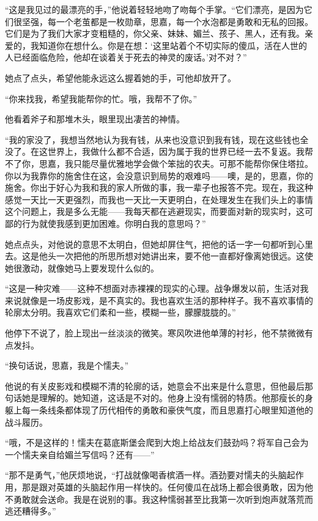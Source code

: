 \par “这是我见过的最漂亮的手，”他说着轻轻地吻了吻每个手掌。“它们漂亮，是因为它们很坚强，每一个老茧都是一枚勋章，思嘉，每一个水泡都是勇敢和无私的回报。它们是为了我们大家才变粗糙的，你父亲、妹妹、媚兰、孩子、黑人，还有我。亲爱的，我知道你在想什么。你是在想：‘这里站着个不切实际的傻瓜，活在人世的人已经面临危险，他却在谈着关于死去的神灵的废话。’对不对？”
\par 她点了点头，希望他能永远这么握着她的手，可他却放开了。
\par “你来找我，希望我能帮你的忙。哦，我帮不了你。”
\par 他看着斧子和那堆木头，眼里现出凄苦的神情。
\par “我的家没了，我想当然地认为我有钱，从来也没意识到我有钱，现在这些钱也全没了。在这世界上，我做什么都不合适，因为属于我的世界已经一去不复返。我帮不了你，思嘉，我只能尽量优雅地学会做个笨拙的农夫。可那不能帮你保住塔拉。你以为我靠你的施舍住在这，会没意识到局势的艰难吗——噢，是的，思嘉，你的施舍。你出于好心为我和我的家人所做的事，我一辈子也报答不完。现在，我这种感觉一天比一天更强烈，而我也一天比一天更明白，在处理发生在我们头上的事情这个问题上，我是多么无能——我每天都在逃避现实，而要面对新的现实时，这可鄙的行为就使我感到更加困难。你明白我的意思吗？”
\par 她点点头，对他说的意思不太明白，但她却屏住气，把他的话一字一句都听到心里去。这是他头一次把他的所思所想对她讲出来，要不他一直都好像离她很远。这使她很激动，就像她马上要发现什么似的。
\par “这是一种灾难——这种不想面对赤裸裸的现实的心理。战争爆发以前，生活对我来说就像是一场皮影戏，是不真实的。我也喜欢生活的那种样子。我不喜欢事情的轮廓太分明。我喜欢它们柔和一些，模糊一些，朦朦胧胧的。”
\par 他停下不说了，脸上现出一丝淡淡的微笑。寒风吹进他单薄的衬衫，他不禁微微有点发抖。
\par “换句话说，思嘉，我是个懦夫。”
\par 他说的有关皮影戏和模糊不清的轮廓的话，她意会不出来是什么意思，但他最后那句话她是理解的。她知道，这话是不对的。他身上没有懦弱的特质。他那瘦长的身躯上每一条线条都体现了历代相传的勇敢和豪侠气度，而且思嘉打心眼里知道他的战斗履历。
\par “哦，不是这样的！懦夫在葛底斯堡会爬到大炮上给战友们鼓劲吗？将军自己会为一个懦夫亲自给媚兰写信吗？还有——”
\par “那不是勇气，”他厌烦地说，“打战就像喝香槟酒一样。酒劲要对懦夫的头脑起作用，那是跟对英雄的头脑起作用一样快的。任何傻瓜在战场上都会很勇敢，因为他不勇敢就会送命。我是在说别的事。我这种懦弱甚至比我第一次听到炮声就落荒而逃还糟得多。”

